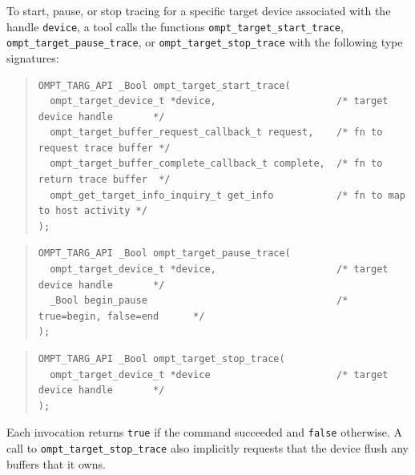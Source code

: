 \documentclass{article}
\begin{document}
To start, pause, or stop tracing for a specific target device associated with the handle \lstinline|device|, 
a tool calls the functions \lstinline|ompt_target_start_trace|, \lstinline|ompt_target_pause_trace|, or \lstinline|ompt_target_stop_trace| with the following type signatures:
\begin{quote}
\begin{lstlisting}
OMPT_TARG_API _Bool ompt_target_start_trace(
  ompt_target_device_t *device,                     /* target device handle       */
  ompt_target_buffer_request_callback_t request,    /* fn to request trace buffer */
  ompt_target_buffer_complete_callback_t complete,  /* fn to return trace buffer  */
  ompt_get_target_info_inquiry_t get_info           /* fn to map to host activity */
);
\end{lstlisting}
\end{quote}

\begin{quote}
\begin{lstlisting}
OMPT_TARG_API _Bool ompt_target_pause_trace(
  ompt_target_device_t *device,                     /* target device handle       */
  _Bool begin_pause                                 /* true=begin, false=end      */
);
\end{lstlisting}
\end{quote}

\begin{quote}
\begin{lstlisting}
OMPT_TARG_API _Bool ompt_target_stop_trace(
  ompt_target_device_t *device                      /* target device handle       */
);
\end{lstlisting}
\end{quote}
\noindent
Each invocation returns \lstinline|true| if the command succeeded and \lstinline|false| otherwise.
A call to \lstinline|ompt_target_stop_trace| also implicitly requests that the device flush any buffers that it owns.

\end{document}
